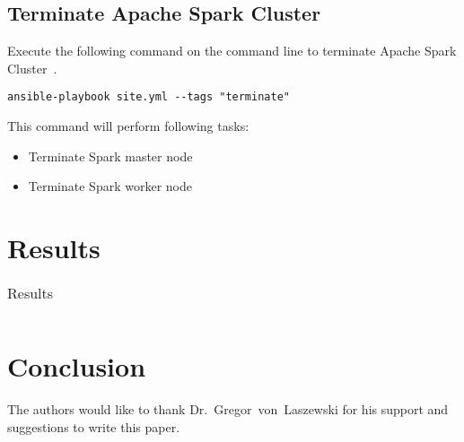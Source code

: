 \subsection{Terminate Apache Spark Cluster}

Execute the following command on the command line to terminate Apache
Spark Cluster~\cite{hid-sp18-511-www-spark}.

\begin{verbatim}
ansible-playbook site.yml --tags "terminate"
\end{verbatim}

This command will perform following tasks:

\begin{itemize}
	\item Terminate Spark master node
	\item Terminate Spark worker node
\end{itemize}

\section{Results}

\begin{table}[hbt]
	\centering \caption{Results}\label{t:results-table} \begin{tabular}{llll} \end{tabular}
\end{table}


\section{Conclusion}



\begin{acks}

  The authors would like to thank Dr.~Gregor~von~Laszewski for his
  support and suggestions to write this paper.

\end{acks}


 


